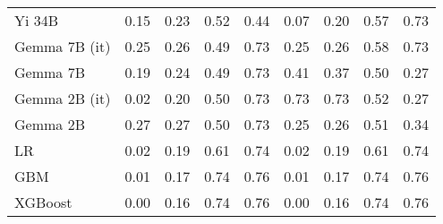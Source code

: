 \begin{tabular}{lllllllll}
Yi 34B & 0.15 & 0.23 & 0.52 & 0.44 & \cellcolor{cyan!25.0} 0.07 & \cellcolor{cyan!25.0} 0.20 & 0.57 & \cellcolor{cyan!20.7} 0.73 \\
Gemma 7B (it) & \cellcolor{orange!8.9} 0.25 & 0.26 & \cellcolor{orange!3.1} 0.49 & \cellcolor{cyan!22.3} 0.73 & 0.25 & 0.26 & \cellcolor{cyan!25.0} 0.58 & \cellcolor{cyan!21.8} 0.73 \\
Gemma 7B & 0.19 & 0.24 & 0.49 & \cellcolor{cyan!25.0} 0.73 & 0.41 & 0.37 & \cellcolor{orange!25.0} 0.50 & \cellcolor{orange!25.0} 0.27 \\
Gemma 2B (it) & \cellcolor{cyan!25.0} 0.02 & \cellcolor{cyan!25.0} 0.20 & 0.50 & \cellcolor{cyan!25.0} 0.73 & \cellcolor{orange!25.0} 0.73 & \cellcolor{orange!25.0} 0.73 & 0.52 & \cellcolor{orange!25.0} 0.27 \\
Gemma 2B & \cellcolor{orange!25.0} 0.27 & \cellcolor{orange!25.0} 0.27 & 0.50 & \cellcolor{cyan!25.0} 0.73 & 0.25 & 0.26 & 0.51 & 0.34 \\
LR & 0.02 & 0.19 & 0.61 & 0.74 & 0.02 & 0.19 & 0.61 & 0.74 \\
GBM & 0.01 & 0.17 & 0.74 & 0.76 & 0.01 & 0.17 & 0.74 & 0.76 \\
XGBoost & 0.00 & 0.16 & 0.74 & 0.76 & 0.00 & 0.16 & 0.74 & 0.76 \\
\bottomrule
\end{tabular}

